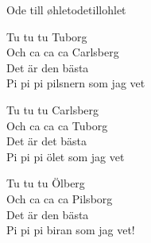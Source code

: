 \begin{song}{Ode till øhlet}{odetillohlet}
\begin{vers}
Tu tu tu Tuborg\\
Och ca ca ca Carlsberg\\
Det är den bästa\\
Pi pi pi pilsnern som jag vet\\
\end{vers}
\begin{vers}
Tu tu tu Carlsberg\\
Och ca ca ca Tuborg\\
Det är det bästa\\
Pi pi pi ölet som jag vet\\
\end{vers}
\begin{vers}
Tu tu tu Ölberg\\
Och ca ca ca Pilsborg\\
Det är den bästa\\
Pi pi pi biran som jag vet!\\
\end{vers}
\end{song}
